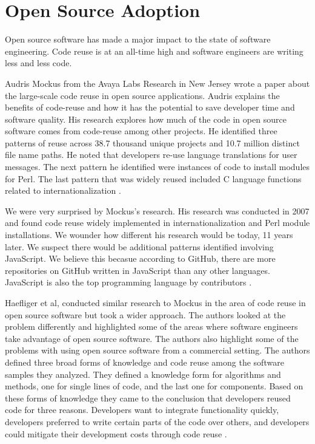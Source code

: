 \documentclass[journal]{IEEEtran}
\begin{document}
\section{Open Source Adoption}
Open source software has made a major impact to the state of software engineering. Code reuse is at an all-time high and software engineers are writing less and less code.  

Audris Mockus from the Avaya Labs Research in New Jersey wrote a paper about the large-scale code reuse in open source applications. Audris explains the benefits of code-reuse and how it has the potential to save developer time and software quality. His research explores how much of the code in open source software comes from code-reuse among other projects. He identified three patterns of reuse across 38.7 thousand unique projects and 10.7 million distinct file name paths. He noted that developers re-use language translations for user messages. The next pattern he identified were instances of code to install modules for Perl. The last pattern that was widely reused included C language functions related to internationalization \cite{Mockus_2007}. 

We were very surprised by Mockus's research. His research was conducted in 2007 and found code reuse widely implemented in internationalization and Perl module installations. We wounder how different his research would be today, 11 years later. We suspect there would be additional patterns identified involving JavaScript. We believe this becasue according to GitHub, there are more repositories on GitHub written in JavaScript than any other languages. JavaScript is also the top programming language by contributors \cite{telliott27_2018}. 

Haefliger et al, conducted similar research to Mockus in the area of code reuse in open source software but took a wider approach. The authors looked at the problem differently and highlighted some of the areas where software engineers take advantage of open source software. The authors also highlight some of the problems with using open source software from a commercial setting. The authors defined three broad forms of knowledge and code reuse among the software samples they analyzed. They defined a knowledge form for algorithms and methods, one for single lines of code, and the last one for components. Based on these forms of knowledge they came to the conclusion that developers reused code for three reasons. Developers want to integrate functionality quickly, developers preferred to write certain parts of the code over others, and developers could mitigate their development costs through code reuse \cite{Haefliger_von}. 
\end{document}
